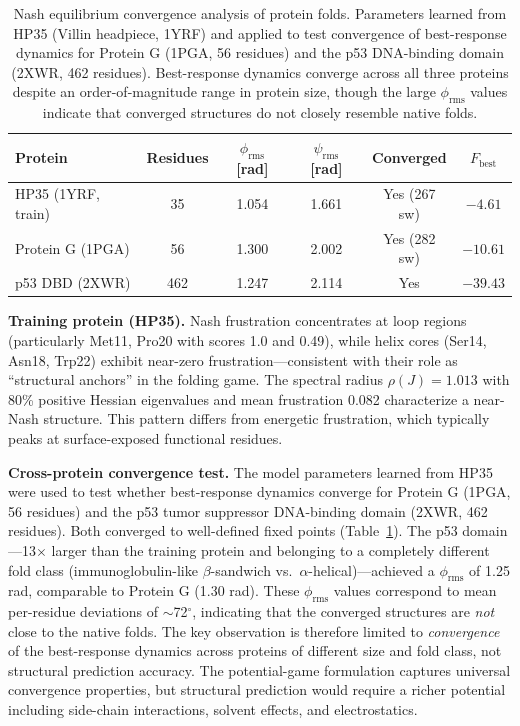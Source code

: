 \documentclass[12pt,a4paper]{article}
\theoremstyle{remark}
\begin{document}
\begin{table}[htbp]
\centering
\caption{Nash equilibrium convergence analysis of protein folds. Parameters learned from HP35 (Villin headpiece, 1YRF) and applied to test convergence of best-response dynamics for Protein G (1PGA, 56 residues) and the p53 DNA-binding domain (2XWR, 462 residues). Best-response dynamics converge across all three proteins despite an order-of-magnitude range in protein size, though the large $\phi_{\text{rms}}$ values indicate that converged structures do not closely resemble native folds.}
\label{tab:nash-results}
\begin{tabular}{lccccc}
\toprule
\textbf{Protein} & \textbf{Residues} & $\phi_{\text{rms}}$ [rad] & $\psi_{\text{rms}}$ [rad] & \textbf{Converged} & $F_{\text{best}}$ \\
\midrule
HP35 (1YRF, train) & 35 & 1.054 & 1.661 & Yes (267 sw) & $-4.61$ \\
Protein G (1PGA) & 56 & 1.300 & 2.002 & Yes (282 sw) & $-10.61$ \\
p53 DBD (2XWR) & 462 & 1.247 & 2.114 & Yes & $-39.43$ \\
\bottomrule
\end{tabular}
\end{table}

\textbf{Training protein (HP35).} Nash frustration concentrates at loop regions (particularly Met11, Pro20 with scores 1.0 and 0.49), while helix cores (Ser14, Asn18, Trp22) exhibit near-zero frustration---consistent with their role as ``structural anchors'' in the folding game. The spectral radius $\rho(J) = 1.013$ with 80\% positive Hessian eigenvalues and mean frustration 0.082 characterize a near-Nash structure. This pattern differs from energetic frustration, which typically peaks at surface-exposed functional residues.

\textbf{Cross-protein convergence test.} The model parameters learned from HP35 were used to test whether best-response dynamics converge for Protein G (1PGA, 56 residues) and the p53 tumor suppressor DNA-binding domain (2XWR, 462 residues). Both converged to well-defined fixed points (Table~\ref{tab:nash-results}). The p53 domain---13$\times$ larger than the training protein and belonging to a completely different fold class (immunoglobulin-like $\beta$-sandwich vs.\ $\alpha$-helical)---achieved a $\phi_{\text{rms}}$ of 1.25 rad, comparable to Protein G (1.30 rad). These $\phi_{\text{rms}}$ values correspond to mean per-residue deviations of $\sim$72$^\circ$, indicating that the converged structures are \emph{not} close to the native folds. The key observation is therefore limited to \emph{convergence} of the best-response dynamics across proteins of different size and fold class, not structural prediction accuracy. The potential-game formulation captures universal convergence properties, but structural prediction would require a richer potential including side-chain interactions, solvent effects, and electrostatics.
\end{document}
